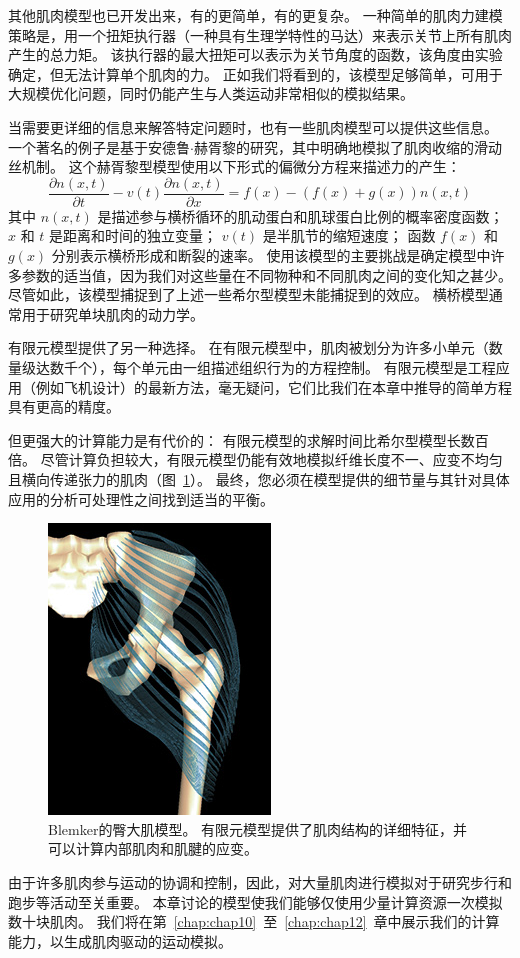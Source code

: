 其他肌肉模型也已开发出来，有的更简单，有的更复杂。
一种简单的肌肉力建模策略是，用一个扭矩执行器（一种具有生理学特性的马达）来表示关节上所有肌肉产生的总力矩。
该执行器的最大扭矩可以表示为关节角度的函数，该角度由实验确定，但无法计算单个肌肉的力。
正如我们将看到的，该模型足够简单，可用于大规模优化问题，同时仍能产生与人类运动非常相似的模拟结果。


当需要更详细的信息来解答特定问题时，也有一些肌肉模型可以提供这些信息。
一个著名的例子是基于安德鲁$\cdot$赫胥黎\cite{huxley1957muscle}的研究，其中明确地模拟了肌肉收缩的滑动丝机制。
这个赫胥黎型模型使用以下形式的偏微分方程来描述力的产生：
%
\begin{equation}
	\frac{\partial n(x,t)}{\partial t}
	- v(t) \frac{\partial n(x,t)}{\partial x}
	= f(x)
	- ( f(x) + g(x) ) n(x,t)
	\label{eq:5_20}
\end{equation}
%
其中 $n(x,t)$ 是描述参与横桥循环的肌动蛋白和肌球蛋白比例的概率密度函数；
$x$ 和 $t$ 是距离和时间的独立变量；
$v(t)$ 是半肌节的缩短速度；
函数 $f(x)$ 和 $g(x)$ 分别表示横桥形成和断裂的速率。
使用该模型的主要挑战是确定模型中许多参数的适当值，因为我们对这些量在不同物种和不同肌肉之间的变化知之甚少。
尽管如此，该模型捕捉到了上述一些希尔型模型未能捕捉到的效应。
横桥模型通常用于研究单块肌肉的动力学。


有限元模型提供了另一种选择。
在有限元模型中，肌肉被划分为许多小单元（数量级达数千个），每个单元由一组描述组织行为的方程控制。
有限元模型是工程应用（例如飞机设计）的最新方法，毫无疑问，它们比我们在本章中推导的简单方程具有更高的精度。


但更强大的计算能力是有代价的：
有限元模型的求解时间比希尔型模型长数百倍。
尽管计算负担较大，有限元模型仍能有效地模拟纤维长度不一、应变不均匀且横向传递张力的肌肉（图~\ref{fig:5_13}）。
最终，您必须在模型提供的细节量与其针对具体应用的分析可处理性之间找到适当的平衡。


\begin{figure}[!htb]
	\centering
	\includegraphics[width=0.4\linewidth]{chap5/5_13}
	\caption{Blemker\cite{blemker2005three}的臀大肌模型。
		有限元模型提供了肌肉结构的详细特征，并可以计算内部肌肉和肌腱的应变。 \label{fig:5_13}}
\end{figure}


由于许多肌肉参与运动的协调和控制，因此，对大量肌肉进行模拟对于研究步行和跑步等活动至关重要。
本章讨论的模型使我们能够仅使用少量计算资源一次模拟数十块肌肉。
我们将在第~\ref{chap:chap10}~至~\ref{chap:chap12}~章中展示我们的计算能力，以生成肌肉驱动的运动模拟。



